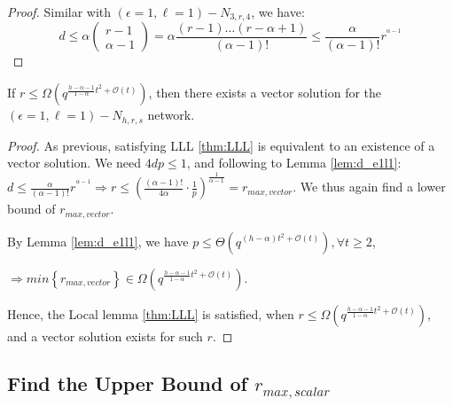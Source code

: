 \begin{proof}
Similar with $\left(\epsilon=1,\ell=1\right)-\ensuremath{N}_{3,r,4}$,
we have:
\[
d\leq\alpha\left(\begin{array}{c}
r-1\\
\alpha-1
\end{array}\right)=\alpha\frac{\left(r-1\right)\ldots\left(r-\alpha+1\right)}{\left(\alpha-1\right)!}\leq\frac{\alpha}{\left(\alpha-1\right)!}r^{^{\alpha-1}}
\]
\end{proof}
\begin{thm}
If $r\leq\Omega\left(q^{\frac{h-\alpha-1}{1-\alpha}t^{2}+\mathcal{O}(t)}\right)$,
then there exists a vector solution for the $\left(\epsilon=1,\ell=1\right)-\ensuremath{N}_{h,r,s}$
network.
\end{thm}
\begin{proof}
As previous, satisfying LLL \ref{thm:LLL} is equivalent to an existence
of a vector solution. We need $4dp\leq1$, and following to Lemma
\ref{lem:d_e1l1}: $d\leq\frac{\alpha}{\left(\alpha-1\right)!}r^{^{\alpha-1}}\Rightarrow r\leq\left(\frac{\left(\alpha-1\right)!}{4\alpha}\cdot\frac{1}{p}\right)^{\frac{1}{\alpha-1}}=r_{max,vector}$.
We thus again find a lower bound of $r_{max,vector}$.

By Lemma \ref{lem:d_e1l1}, we have $p\leq\Theta\left(q^{\left(h-\alpha\right)t^{2}+\mathcal{O}(t)}\right),\forall t\geq2$,

$\Rightarrow min\left\{ r_{max,vector}\right\} \in\Omega\left(q^{\frac{h-\alpha-1}{1-\alpha}t^{2}+\mathcal{O}(t)}\right)$.

Hence, the Local lemma \ref{thm:LLL} is satisfied, when $r\leq\Omega\left(q^{\frac{h-\alpha-1}{1-\alpha}t^{2}+\mathcal{O}(t)}\right)$,
and a vector solution exists for such $r$.
\end{proof}

\subsection{Find the Upper Bound of $r_{max,scalar}$}

\noindent{}

